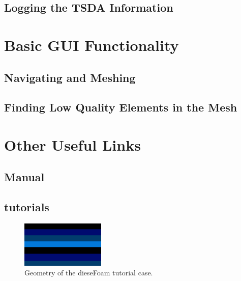 \documentclass{report}
\begin{document}
\section{Logging the TSDA Information}

\newpage

\chapter{Basic GUI Functionality}
\section{Navigating and Meshing}

\newpage
\section{Finding Low Quality Elements in the Mesh}

\chapter{Other Useful Links}
\section{Manual}
\section{tutorials}

\begin{figure}[h]
  \centering
  \includegraphics[width=4cm]{geo1.png}
  \setcaptionwidth{14cm}
  \caption{Geometry of the dieseFoam tutorial case.}
  \label{geo1}
\end{figure}
\newpage
\end{document}
